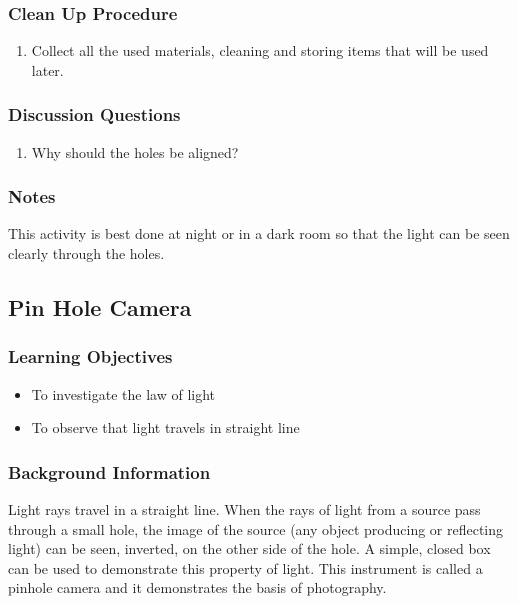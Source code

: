 \subsubsection*{Clean Up Procedure}
\begin{enumerate}
\item{Collect all the used materials, cleaning and storing items that will be used later.} 
\end{enumerate}

\subsubsection*{Discussion Questions}
\begin{enumerate}
\item{Why should the holes be aligned?}
\end{enumerate}

\subsubsection*{Notes}
This activity is best done at night or in a dark room so that the light can be seen clearly through the holes.


\subsection{Pin Hole Camera}

\subsubsection*{Learning Objectives}
\begin{itemize}
\item{To investigate the law of light} 
\item{To observe that light travels in straight line} 
\end{itemize}

\subsubsection*{Background Information}
Light rays travel in a straight line.  When the rays of light from a source pass through a small hole, the image of the source (any object producing or reflecting light) can be seen, inverted, on the other side of the hole.  A simple, closed box can be used to demonstrate this property of light.  This instrument is called a pinhole camera and it demonstrates the basis of photography.

